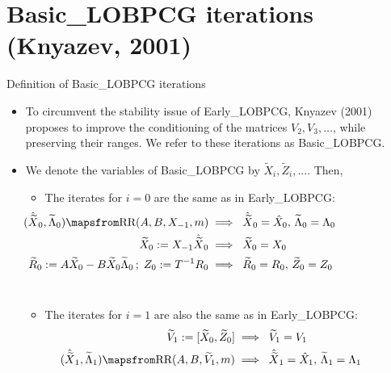 \documentclass[t,usepdftitle=false]{beamer}
\begin{document}
\section{Basic\_LOBPCG iterations (Knyazev, 2001)}

\begin{frame}{Definition of Basic\_LOBPCG iterations}
	\begin{itemize}
	\item To circumvent the stability issue of Early\_LOBPCG, Knyazev (2001) proposes to improve the conditioning of the matrices $V_2,V_3,\dots$, while preserving their ranges. 
	We refer to these iterations as Basic\_LOBPCG.
	\item We denote the variables of Basic\_LOBPCG by $\widetilde{X}_i,\widetilde{Z}_i,...$. Then,\smallskip
	\begin{itemize}
	\item The iterates for $i=0$ are the same as in Early\_LOBPCG:\vspace{-.1cm}
	\begin{align*}
	\hspace{-3.1cm}
	(\hat{\widetilde{X}}_0,\widetilde{\Lambda}_0)\mapsfrom\text{RR}(A,B,X_{-1},m)
	&\implies\;\hat{\widetilde{X}}_0=\hat{X}_0,\,\widetilde{\Lambda}_0=\Lambda_0\\
	\hspace{-3.1cm}
	\widetilde{X}_0:=X_{-1}\hat{\widetilde{X}}_0
	&\implies\;\widetilde{X}_0=X_0\\
	\hspace{-3.1cm}
	\widetilde{R}_0:=A\widetilde{X}_0-B\widetilde{X}_0\widetilde{\Lambda}_0
	\,;\;Z_0:=T^{-1}R_0
	&\implies\;\widetilde{R}_0=R_0,\,\widetilde{Z}_0=Z_0
	\end{align*}
	\vspace{-.5cm}\\
	\item The iterates for $i=1$ are also the same as in Early\_LOBPCG:\vspace{-.1cm}
	\begin{align*}
	\hspace{-1.1cm}
	\widetilde{V}_1:=[\widetilde{X}_0,\widetilde{Z}_0]
	&\implies\;\widetilde{V}_1=V_1\\
	\hspace{-1.1cm}
	(\hat{\widetilde{X}}_1,\widetilde{\Lambda}_1)\mapsfrom\text{RR}(A,B,\widetilde{V}_{1},m)
	&\implies\;\hat{\widetilde{X}}_1=\hat{X}_1,\,\widetilde{\Lambda}_1=\Lambda_1\\
	\hspace{-1.1cm}

\end{align*}
\end{itemize}
\end{itemize}
\end{frame}
\end{document}
